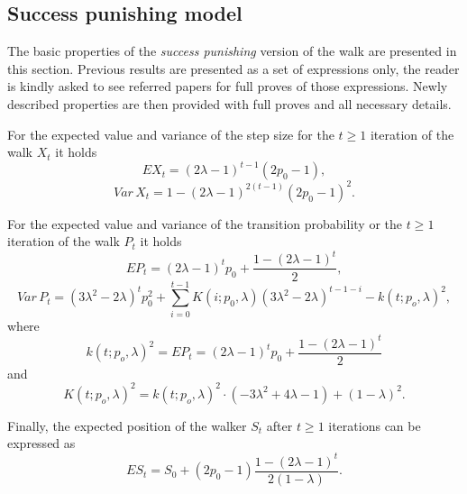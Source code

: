 \documentclass[runningheads]{CMSIM}
\begin{document}
    \subsection{Success punishing model}\label{subsec:success-punishing-model}

    The basic properties of the \emph{success punishing }version of the
    walk are presented in this section.
    Previous results are presented
    as a set of expressions only, the reader is kindly asked to see referred
    papers for full proves of those expressions.
    Newly described properties
    are then provided with full proves and all necessary details.

    For the expected value and variance of the step size for the $t\ge1$
    iteration of the walk $X_{t}$ it holds~\cite{ja2019apmat}
    \begin{equation}
        EX_{t}=(2\lambda-1)^{t-1}(2p_{0}-1),\label{eq:e_x_t_sp}
    \end{equation}
    \begin{equation}
        Var\,X_{t}=1-(2\lambda-1)^{2(t-1)}(2p_{0}-1)^{2}.\label{eq:var_x_t_sp}
    \end{equation}

    For the expected value and variance of the transition probability
    or the $t\ge1$ iteration of the walk $P_{t}$ it holds~\cite{ja2017ddny,ja2019apmat}
    \begin{equation}
        EP_{t}=(2\lambda-1)^{t}p_{0}+\frac{1-(2\lambda-1)^{t}}{2},\label{eq:e_p_t_sp}
    \end{equation}
    \begin{equation}
        Var\,P_{t}=(3\lambda^{2}-2\lambda)^{t}p_{0}^{2}+\sum_{i=0}^{t-1}K(i;p_{0},\lambda)(3\lambda^{2}-2\lambda)^{t-1-i}-k(t;p_{o},\lambda)^{2},\label{eq:var_p_t_sp}
    \end{equation}
    where
    \[
        k(t;p_{o},\lambda)^{2}=EP_{t}=(2\lambda-1)^{t}p_{0}+\frac{1-(2\lambda-1)^{t}}{2}
    \]
    and
    \[
        K(t;p_{o},\lambda)^{2}=k(t;p_{o},\lambda)^{2}\cdot(-3\lambda^{2}+4\lambda-1)+(1-\lambda)^{2}.
    \]

    Finally, the expected position of the walker $S_{t}$ after $t\geq1$
    iterations can be expressed as~\cite{ja2017ddny}
    \begin{equation}
        ES_{t}=S_{0}+(2p_{0}-1)\frac{1-(2\lambda-1)^{t}}{2(1-\lambda)}.\label{eq:e_s_t_sp}
    \end{equation}
\end{document}
